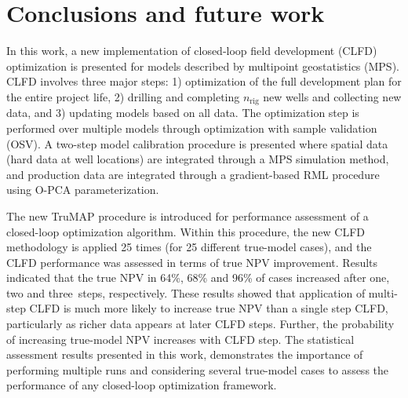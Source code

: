 \documentclass[11pt]{article}
\begin{document}


\section{Conclusions and future work} \label{sec:CR}
In this work, a new implementation of closed-loop field development (CLFD) optimization is presented for models
described by multipoint geostatistics (MPS). CLFD involves three major steps: 1) optimization of
the full development plan for the entire project life, 2) drilling and completing $n_{\text{rig}}$ new wells and collecting new data,
and 3) updating models based on all data.
The optimization step is performed over multiple models through optimization with sample validation (OSV).
A two-step model calibration procedure is presented where spatial data (hard data at well locations)
are integrated through a MPS simulation method, and production data are integrated through a gradient-based RML procedure
using O-PCA parameterization.


The new TruMAP procedure is introduced for performance assessment of a closed-loop optimization algorithm.
Within this procedure, the new CLFD methodology is applied 25 times (for 25 different true-model cases),
and the CLFD performance was assessed in terms of true NPV improvement.
Results indicated that the true NPV in 64\%, 68\% and 96\% of cases increased
after one, two and three~steps, respectively.
These results showed that application of multi-step CLFD
is much more likely to increase true NPV than a single step CLFD,
particularly as richer data appears at later CLFD steps.
Further, the probability of increasing true-model NPV increases with CLFD step.
The statistical assessment results presented in this work, demonstrates the importance of
performing multiple runs
and considering several true-model cases to assess the performance
of any closed-loop optimization framework.
\end{document}
